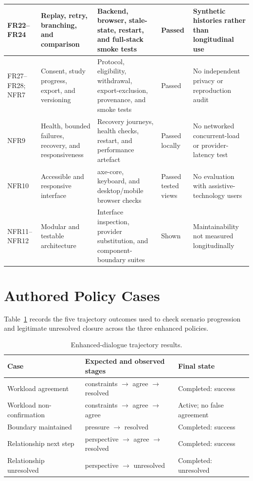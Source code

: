 \begin{table}[p]
\begin{tabularx}{\textwidth}{|>{\raggedright\arraybackslash}p{}|>{\raggedright\arraybackslash}p{}|>{\raggedright\arraybackslash}p{}|>{\raggedright\arraybackslash}p{}|X|}
FR22--FR24 & Replay, retry, branching, and comparison & Backend, browser, stale-state, restart, and full-stack smoke tests & Passed & Synthetic histories rather than longitudinal use \\ \hline
FR27--FR28; NFR7 & Consent, study progress, export, and versioning & Protocol, eligibility, withdrawal, export-exclusion, provenance, and smoke tests & Passed & No independent privacy or reproduction audit \\ \hline
NFR9 & Health, bounded failures, recovery, and responsiveness & Recovery journeys, health checks, restart, and performance artefact & Passed locally & No networked concurrent-load or provider-latency test \\ \hline
NFR10 & Accessible and responsive interface & axe-core, keyboard, and desktop/mobile browser checks & Passed tested views & No evaluation with assistive-technology users \\ \hline
NFR11--NFR12 & Modular and testable architecture & Interface inspection, provider substitution, and component-boundary suites & Shown & Maintainability not measured longitudinally \\ \hline
\end{tabularx}
\end{table}

\section{Authored Policy Cases}

Table~\ref{tab:dialogue-case-results} records the five trajectory outcomes used to check scenario progression and legitimate unresolved closure across the three enhanced policies.

\begin{table}[htbp]
\centering
\caption{Enhanced-dialogue trajectory results.}
\label{tab:dialogue-case-results}
\footnotesize
\begin{tabularx}{\textwidth}{|>{\raggedright\arraybackslash}p{}|X|>{\raggedright\arraybackslash}p{}|}
\hline
\textbf{Case} & \textbf{Expected and observed stages} & \textbf{Final state} \\ \hline
Workload agreement & constraints $\rightarrow$ agree $\rightarrow$ resolved & Completed: success \\ \hline
Workload non-confirmation & constraints $\rightarrow$ agree $\rightarrow$ agree & Active; no false agreement \\ \hline
Boundary maintained & pressure $\rightarrow$ resolved & Completed: success \\ \hline
Relationship next step & perspective $\rightarrow$ agree $\rightarrow$ resolved & Completed: success \\ \hline
Relationship unresolved & perspective $\rightarrow$ unresolved & Completed: unresolved \\ \hline
\end{tabularx}
\end{table}

